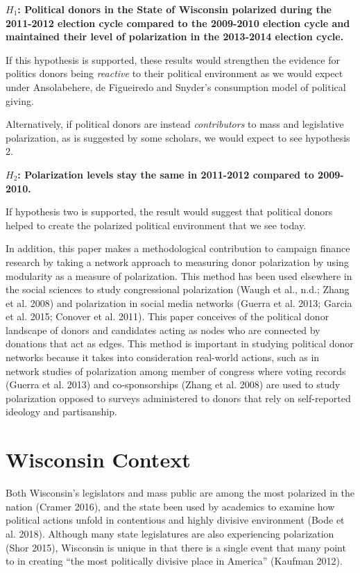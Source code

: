 \documentclass[12pt,]{article}
\begin{document}
\textbf{\(H_{1}\): Political donors in the State of Wisconsin polarized
during the 2011-2012 election cycle compared to the 2009-2010 election
cycle and maintained their level of polarization in the 2013-2014
election cycle.}

If this hypothesis is supported, these results would strengthen the
evidence for politics donors being \emph{reactive} to their political
environment as we would expect under Ansolabehere, de Figueiredo and
Snyder's consumption model of political giving.

Alternatively, if political donors are instead \emph{contributors} to
mass and legislative polarization, as is suggested by some scholars, we
would expect to see hypothesis 2.

\textbf{\(H_{2}\): Polarization levels stay the same in 2011-2012
compared to 2009-2010.}

If hypothesis two is supported, the result would suggest that political
donors helped to create the polarized political environment that we see
today.

In addition, this paper makes a methodological contribution to campaign
finance research by taking a network approach to measuring donor
polarization by using modularity as a measure of polarization. This
method has been used elsewhere in the social sciences to study
congressional polarization (Waugh et al., n.d.; Zhang et al. 2008) and
polarization in social media networks (Guerra et al. 2013; Garcia et al.
2015; Conover et al. 2011). This paper conceives of the political donor
landscape of donors and candidates acting as nodes who are connected by
donations that act as edges. This method is important in studying
political donor networks because it takes into consideration real-world
actions, such as in network studies of polarization among member of
congress where voting records (Guerra et al. 2013) and co-sponsorships
(Zhang et al. 2008) are used to study polarization opposed to surveys
administered to donors that rely on self-reported ideology and
partisanship.

\hypertarget{wisconsin-context}{%
\section{Wisconsin Context}\label{wisconsin-context}}

Both Wisconsin's legislators and mass public are among the most
polarized in the nation (Cramer 2016), and the state been used by
academics to examine how political actions unfold in contentious and
highly divisive environment (Bode et al. 2018). Although many state
legislatures are also experiencing polarization (Shor 2015), Wisconsin
is unique in that there is a single event that many point to in creating
``the most politically divisive place in America'' (Kaufman 2012).
\end{document}
